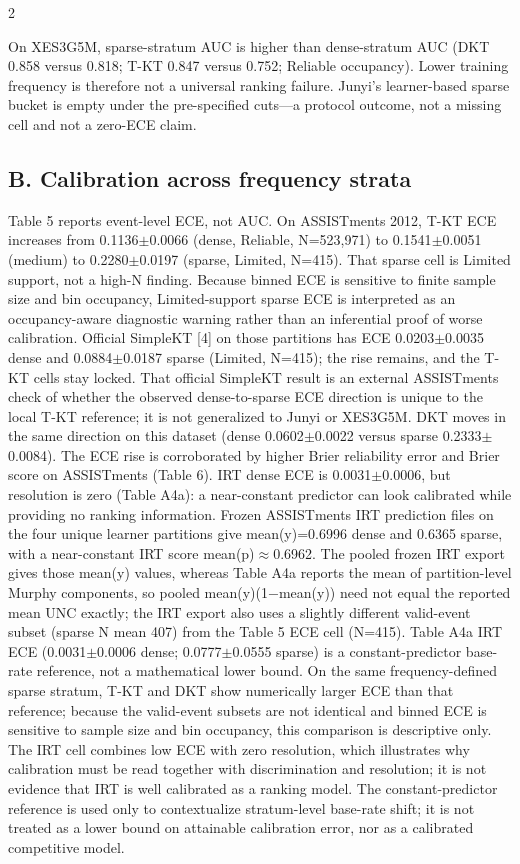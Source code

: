 \documentclass[10pt,a4paper]{article}
\begin{document}
\vspace{0.55em}
\begin{multicols}{2}


On XES3G5M, sparse-stratum AUC is higher than dense-stratum AUC (DKT 0.858 versus 0.818; T-KT 0.847 versus 0.752; Reliable occupancy). Lower training frequency is therefore not a universal ranking failure. Junyi's learner-based sparse bucket is empty under the pre-specified cuts---a protocol outcome, not a missing cell and not a zero-ECE claim.

\subsection*{B. Calibration across frequency strata}

Table 5 reports event-level ECE, not AUC. On ASSISTments 2012, T-KT ECE increases from 0.1136$\pm$0.0066 (dense, Reliable, N=523,971) to 0.1541$\pm$0.0051 (medium) to 0.2280$\pm$0.0197 (sparse, Limited, N=415). That sparse cell is Limited support, not a high-N finding. Because binned ECE is sensitive to finite sample size and bin occupancy, Limited-support sparse ECE is interpreted as an occupancy-aware diagnostic warning rather than an inferential proof of worse calibration. Official SimpleKT [4] on those partitions has ECE 0.0203$\pm$0.0035 dense and 0.0884$\pm$0.0187 sparse (Limited, N=415); the rise remains, and the T-KT cells stay locked. That official SimpleKT result is an external ASSISTments check of whether the observed dense-to-sparse ECE direction is unique to the local T-KT reference; it is not generalized to Junyi or XES3G5M. DKT moves in the same direction on this dataset (dense 0.0602$\pm$0.0022 versus sparse 0.2333$\pm$0.0084). The ECE rise is corroborated by higher Brier reliability error and Brier score on ASSISTments (Table 6). IRT dense ECE is 0.0031$\pm$0.0006, but resolution is zero (Table A4a): a near-constant predictor can look calibrated while providing no ranking information. Frozen ASSISTments IRT prediction files on the four unique learner partitions give mean(y)=0.6996 dense and 0.6365 sparse, with a near-constant IRT score mean(p)$\approx$0.6962. The pooled frozen IRT export gives those mean(y) values, whereas Table A4a reports the mean of partition-level Murphy components, so pooled mean(y)(1$-$mean(y)) need not equal the reported mean UNC exactly; the IRT export also uses a slightly different valid-event subset (sparse N mean 407) from the Table 5 ECE cell (N=415). Table A4a IRT ECE (0.0031$\pm$0.0006 dense; 0.0777$\pm$0.0555 sparse) is a constant-predictor base-rate reference, not a mathematical lower bound. On the same frequency-defined sparse stratum, T-KT and DKT show numerically larger ECE than that reference; because the valid-event subsets are not identical and binned ECE is sensitive to sample size and bin occupancy, this comparison is descriptive only. The IRT cell combines low ECE with zero resolution, which illustrates why calibration must be read together with discrimination and resolution; it is not evidence that IRT is well calibrated as a ranking model. The constant-predictor reference is used only to contextualize stratum-level base-rate shift; it is not treated as a lower bound on attainable calibration error, nor as a calibrated competitive model.

\end{multicols}
\end{document}
